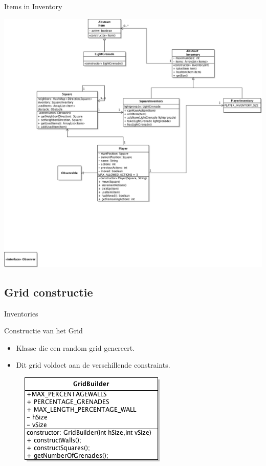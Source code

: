 \documentclass[t]{beamer}
\begin{document}
\begin{frame}[plain]{Items in Inventory}
\begin{center}
\includegraphics[width= 0.9\linewidth]{../uml/classdiagramInventory.png}
\end{center}
\end{frame}

\subsection{Grid constructie}
\begin{frame}{Inventories}
\begin{multicols}{2}
\tableofcontents[currentsection]
\end{multicols}
\end{frame}

\begin{frame}{Constructie van het Grid}
\begin{itemize}
	\item Klasse die een random grid genereert.
	\item Dit grid voldoet aan de verschillende constraints.
\end{itemize}

\begin{figure}
\begin{center}
\includegraphics[scale=0.5]{../uml/gridBuilder.png}
\end{center}
\end{figure}

\end{frame}
\end{document}
